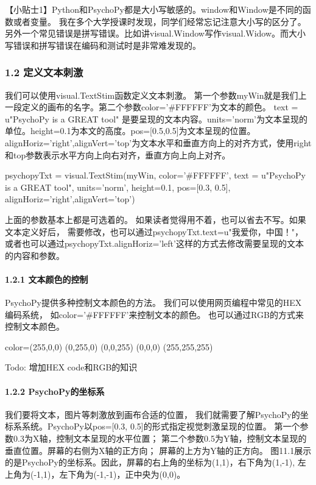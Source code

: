 \documentclass[11pt]{article}
\begin{document}
    【小贴士1】Python和PsychoPy都是大小写敏感的。window和Window是不同的函数或者变量。
我在多个大学授课时发现，同学们经常忘记注意大小写的区分了。另外一个常见错误是拼写错误。比如讲visual.Window写作visual.Widow。而大小写错误和拼写错误在编码和测试时是非常难发现的。

    \subsubsection{1.2
定义文本刺激}\label{ux5b9aux4e49ux6587ux672cux523aux6fc0}

我们可以使用visual.TextStim函数定义文本刺激。
第一个参数myWin就是我们上一段定义的画布的名字。第二个参数color='\#FFFFFF'为文本的颜色。
text = u"PsychoPy is a GREAT tool"
是要呈现的文本内容。units='norm'为文本呈现的单位。height=0.1为本文的高度。pos={[}0.5,0.5{]}为文本呈现的位置。
alignHoriz='right',alignVert='top'为文本水平和垂直方向上的对齐方式，使用right和top参数表示水平方向上向右对齐，垂直方向上向上对齐。

psychopyTxt = visual.TextStim(myWin, color='\#FFFFFF', text = u"PsychoPy
is a GREAT tool", units='norm', height=0.1, pos={[}0.3, 0.5{]},
alignHoriz='right',alignVert='top')

上面的参数基本上都是可选着的。
如果读者觉得用不着，也可以省去不写。如果文本定义好后，
需要修改，也可以通过psychopyTxt.text=u"我爱你，中国！"，或者也可以通过psychopyTxt.alignHoriz='left'这样的方式去修改需要呈现的文本的内容和参数。

\paragraph{1.2.1
文本颜色的控制}\label{ux6587ux672cux989cux8272ux7684ux63a7ux5236}

PsychoPy提供多种控制文本颜色的方法。 我们可以使用网页编程中常见的HEX
编码系统， 如color='\#FFFFFF'来控制文本的颜色。
也可以通过RGB的方式来控制文本颜色。

color=(255,0,0) (0,255,0) (0,0,255) (0,0,0) (255,255,255)


Todo: 增加HEX code和RGB的知识

\paragraph{1.2.2
PsychoPy的坐标系}\label{psychopyux7684ux5750ux6807ux7cfb}

我们要将文本，图片等刺激放到画布合适的位置，
我们就需要了解PsychoPy的坐标系系统。PsychoPy以pos={[}0.3,
0.5{]}的形式指定视觉刺激呈现的位置。
第一个参数0.3为X轴，控制文本呈现的水平位置；
第二个参数0.5为Y轴，控制文本呈现的垂直位置。屏幕的右侧为X轴的正方向；
屏幕的上方为Y轴的正方向。
图11.1展示的是PsychoPy的坐标系。因此，屏幕的右上角的坐标为(1,1)，右下角为(1,-1),
左上角为(-1,1)，左下角为(-1,-1)，正中央为(0,0)。
\end{document}
